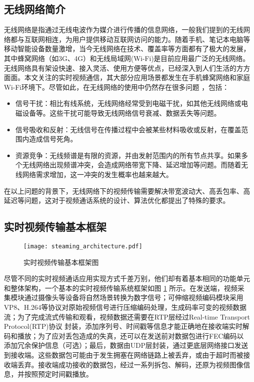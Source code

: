 \subsection{无线网络简介}
无线网络是指通过无线电波作为媒介进行传播的信息网络，一般我们提到的无线网络都与互联网相连，为用户提供移动互联网访问的能力。随着手机、笔记本电脑等移动智能设备数量激增，当今无线网络在技术、覆盖率等方面都有了极大的发展，其中蜂窝网络（如3G、4G）和无线局域网(Wi-Fi)是目前应用最广泛的无线网络。无线网络具有架设快速、接入灵活、使用方便等优点，已经深入到人们生活的方方面面。本文关注的实时视频通信，其大部分应用场景都发生在手机蜂窝网络和家庭Wi-Fi环境下。尽管如此，在无线网络的使用中仍然存在很多问题 \cite{heusse2003performance}，包括：
\begin{itemize}
    \item 信号干扰：相比有线系统，无线网络经常受到电磁干扰，如其他无线网络或电磁设备等。这些干扰可能导致无线网络信号衰减、数据丢失等问题。
    \item 信号吸收和反射：无线信号在传播过程中会被某些材料吸收或反射，在覆盖范围内造成信号死角。
    \item 资源竞争：无线频谱是有限的资源，并由发射范围内的所有节点共享。如果多个无线网络出现频谱冲突，会造成网络带宽下降、延迟增加等问题。而随着无线网络需求增加，这一冲突的发生概率也越来越大。
\end{itemize}

在以上问题的背景下，无线网络下的视频传输需要解决带宽波动大、高丢包率、高延迟等问题，这对于视频通话系统的设计、算法优化都提出了特殊的要求。


\subsection{实时视频传输基本框架}

\begin{figure}[htbp]
  \centering
  \texttt{[image: steaming\_architecture.pdf]}
  \caption{实时视频传输基本框架图}
  \label{fig:steaming_architecture}
\end{figure}

尽管不同的实时视频通话应用实现方式千差万别，他们却有着基本相同的功能单元和整体架构，一个基本的实时视频传输系统框架如图 \ref{fig:steaming_architecture} \cite{wu2000transporting}所示。在发送端，视频采集模块通过摄像头等设备将自然场景转换为数字信号；可伸缩视频编码模块采用VP8、H.264等协议对原始视频信号进行压缩编码处理，生成码率可变的视频数据流；为了完成流式传输和观看，视频数据还需要在RTP层经过Real-time Transport Protocol(RTP)协议 \cite{jacobson2003rtp} 封装，添加序列号、时间戳等信息才能正确地在接收端实时解码和播放；为了应对丢包造成的失真，还可以在发送前对数据包进行FEC编码以添加冗余保护信息（可选）；最后，数据由UDP层封装，通过更底层网络接口发送到接收端。这些数据包可能由于发生拥塞在网络链路上被丢弃，或由于超时而被接收端丢弃。接收端成功接收的数据包，经过一系列拆包、解码，还原为视频图像信息，并按照预定时间戳播放。


